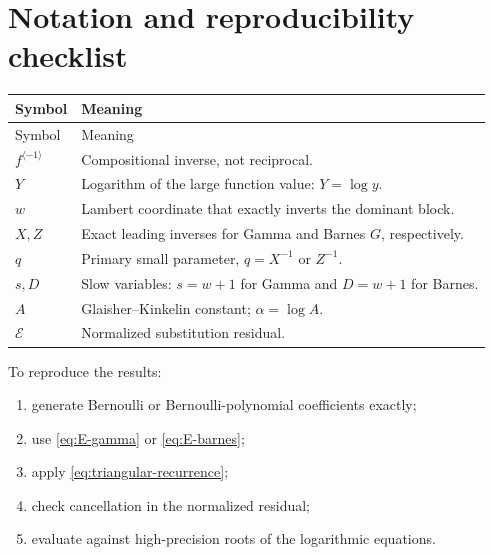 \documentclass[11pt,a4paper]{article}
\numberwithin{equation}{section}
\theoremstyle{definition}
\theoremstyle{remark}
\newcommand{\cinv}{\langle-1\rangle}
\begin{document}
\section{Notation and reproducibility checklist}

\begin{longtable}{@{}p{}p{}@{}}
\toprule
Symbol & Meaning\\
\midrule
\endfirsthead
\toprule
Symbol & Meaning\\
\midrule
\endhead
\(f^{\cinv}\) & Compositional inverse, not reciprocal.\\
\(Y\) & Logarithm of the large function value: \(Y=\log y\).\\
\(w\) & Lambert coordinate that exactly inverts the dominant block.\\
\(X,Z\) & Exact leading inverses for Gamma and Barnes \(G\), respectively.\\
\(q\) & Primary small parameter, \(q=X^{-1}\) or \(Z^{-1}\).\\
\(s,D\) & Slow variables: \(s=w+1\) for Gamma and \(D=w+1\) for Barnes.\\
\(A\) & Glaisher--Kinkelin constant; \(\alpha=\log A\).\\
\(\mathscr E\) & Normalized substitution residual.\\
\bottomrule
\end{longtable}

To reproduce the results:
\begin{enumerate}
\item generate Bernoulli or Bernoulli-polynomial coefficients exactly;
\item use \cref{eq:E-gamma} or \cref{eq:E-barnes};
\item apply \cref{eq:triangular-recurrence};
\item check cancellation in the normalized residual;
\item evaluate against high-precision roots of the logarithmic equations.
\end{enumerate}
\end{document}
